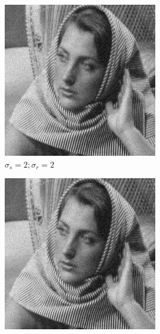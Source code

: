 \documentclass[12pt]{article}
\begin{document}
\begin{figure}[h]
\begin{subfigure}[b]{0.24\textwidth}
        \includegraphics[width=\textwidth]{../images/filtered_barbara_10_sigma_s_2_sigma_r_2.png}
        \caption{$\sigma_s=2;\sigma_r=2$}
        \label{fig:subfig2}
    \end{subfigure}
    \begin{subfigure}[b]{0.24\textwidth}
        \centering
        \includegraphics[width=\textwidth]{../images/filtered_barbara_10_sigma_s_0.1_sigma_r_0.1.png}

\end{subfigure}
\end{figure}
\end{document}

